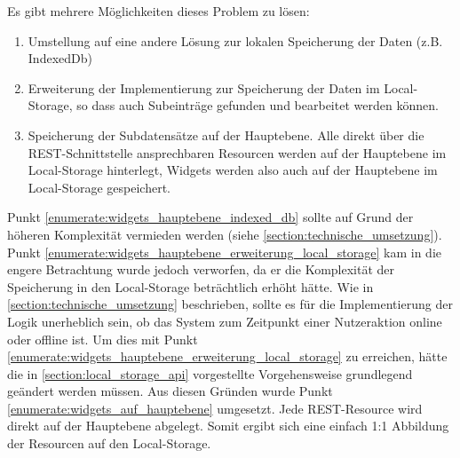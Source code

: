 Es gibt mehrere Möglichkeiten dieses Problem zu lösen:
\begin{enumerate}
 \item\label{enumerate:widgets_hauptebene_indexed_db} Umstellung auf eine andere Lösung zur lokalen Speicherung der Daten (z.B. IndexedDb)
 \item\label{enumerate:widgets_hauptebene_erweiterung_local_storage} Erweiterung der Implementierung zur Speicherung der Daten im Local-Storage, so dass auch Subeinträge gefunden und bearbeitet werden können.
 \item\label{enumerate:widgets_auf_hauptebene} Speicherung der Subdatensätze auf der Hauptebene. Alle direkt über die REST-Schnittstelle ansprechbaren Resourcen werden auf der Hauptebene im Local-Storage hinterlegt, Widgets werden also auch auf der Hauptebene im Local-Storage gespeichert.
\end{enumerate}
Punkt \ref{enumerate:widgets_hauptebene_indexed_db} sollte auf Grund der höheren Komplexität vermieden werden (siehe \ref{section:technische_umsetzung}). Punkt \ref{enumerate:widgets_hauptebene_erweiterung_local_storage} kam in die engere Betrachtung wurde jedoch verworfen, da er die Komplexität der Speicherung in den Local-Storage beträchtlich erhöht hätte. Wie in \ref{section:technische_umsetzung} beschrieben, sollte es für die Implementierung der Logik unerheblich sein, ob das System zum Zeitpunkt einer Nutzeraktion online oder offline ist. Um dies mit Punkt \ref{enumerate:widgets_hauptebene_erweiterung_local_storage} zu erreichen, hätte die in \ref{section:local_storage_api} vorgestellte Vorgehensweise grundlegend geändert werden müssen. Aus diesen Gründen wurde Punkt \ref{enumerate:widgets_auf_hauptebene} umgesetzt. Jede REST-Resource wird direkt auf der Hauptebene abgelegt. Somit ergibt sich eine einfach 1:1 Abbildung der Resourcen auf den Local-Storage. 

